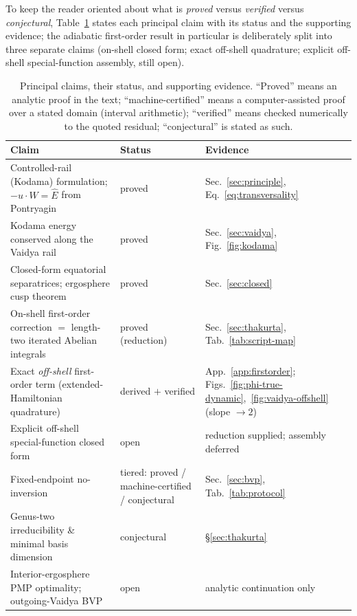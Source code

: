 \documentclass[12pt]{iopart}
\newcommand{\Ehat}{\hat E}
\begin{document}
To keep the reader oriented about what is \emph{proved} versus \emph{verified}
versus \emph{conjectural}, Table~\ref{tab:claims} states each principal claim with
its status and the supporting evidence; the adiabatic first-order result in
particular is deliberately split into three separate claims (on-shell closed form;
exact off-shell quadrature; explicit off-shell special-function assembly, still
open).

\begin{table}[htbp]
    \centering
    \caption{Principal claims, their status, and supporting evidence. ``Proved''
    means an analytic proof in the text; ``machine-certified'' means a
    computer-assisted proof over a stated domain (interval arithmetic);
    ``verified'' means checked numerically to the quoted residual; ``conjectural''
    is stated as such.}
    \label{tab:claims}
    \small
    \begin{tabular}{p{}p{}p{}}
        \hline\hline
        Claim & Status & Evidence\\
        \hline
        Controlled-rail (Kodama) formulation; $-u\cdot W=\Ehat$ from Pontryagin
            & proved & Sec.~\ref{sec:principle}, Eq.~\eqref{eq:transversality}\\
        Kodama energy conserved along the Vaidya rail
            & proved & Sec.~\ref{sec:vaidya}, Fig.~\ref{fig:kodama}\\
        Closed-form equatorial separatrices; ergosphere cusp theorem
            & proved & Sec.~\ref{sec:closed}\\
        On-shell first-order correction $=$ length-two iterated Abelian integrals
            & proved (reduction) & Sec.~\ref{sec:thakurta}, Tab.~\ref{tab:script-map}\\
        Exact \emph{off-shell} first-order term (extended-Hamiltonian quadrature)
            & derived $+$ verified & App.~\ref{app:firstorder};
              Figs.~\ref{fig:phi-true-dynamic},~\ref{fig:vaidya-offshell}
              (slope $\to2$)\\
        Explicit off-shell special-function closed form
            & open & reduction supplied; assembly deferred\\
        Fixed-endpoint no-inversion
            & tiered: proved / machine-certified / conjectural
            & Sec.~\ref{sec:bvp}, Tab.~\ref{tab:protocol}\\
        Genus-two irreducibility \& minimal basis dimension
            & conjectural & \S\ref{sec:thakurta}\\
        Interior-ergosphere PMP optimality; outgoing-Vaidya BVP
            & open & analytic continuation only\\
        \hline\hline
    \end{tabular}
\end{table}
\end{document}
